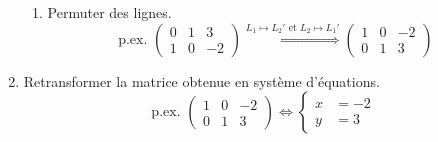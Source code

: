 \begin{enumerate}
\begin{enumerate}
\item Permuter des lignes.
\[\text{p.ex. } \left(\begin{array}{cc|c} 0 & 1 & 3 \\ 1 & 0 & -2 \end{array}\right)  \stackrel{L_1  \mapsto L_2' \text{ et } L_2  \mapsto L_1'}{\Longrightarrow} \left(\begin{array}{cc|c} 1 & 0 & -2 \\ 0 & 1 & 3  \end{array}\right) \]
\end{enumerate}
\item Retransformer la matrice obtenue en système d'équations.
\[\text{p.ex. }  \left(\begin{array}{cc|c} 1 & 0 & -2 \\ 0 & 1 & 3  \end{array}\right) \Leftrightarrow \begin{cases} x &= -2 \\ y &= 3 \end{cases}  \]
\end{enumerate}

